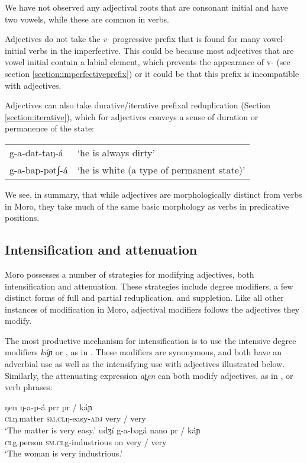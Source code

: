 We have not observed any adjectival roots that are consonant initial and have two vowels, while these are common in verbs. 

Adjectives do not take the \textit{v-} progressive prefix that is found for many vowel-initial verbs in the imperfective. This could be because most adjectives that are vowel initial contain a labial element, which prevents the appearance of v- (see section \ref{section:imperfectiveprefix}) or it could be that this prefix is incompatible with adjectives.

Adjectives can also take durative/iterative prefixal reduplication (Section \ref{section:iterative}), which for adjectives conveys a sense of duration or permanence of the state:

\ea 
\begin{tabular}[t]{ll}
g-a-dat-taŋ-á & ‘he is always dirty’\\
g-a-bap-pətʃ-á & ‘he is white (a type of permanent state)’\\
\end{tabular} \z

We see, in summary, that while adjectives are morphologically distinct from verbs in Moro, they take much of the same basic morphology as verbs in predicative positions.

\subsection{Intensification and attenuation}

Moro possesses a number of strategies for modifying adjectives, both intensification and attenuation. These strategies include degree modifiers, a few distinct forms of full and partial reduplication, and suppletion. Like all other instances of modification in Moro, adjectival modifiers follows the adjectives they modify.

The most productive mechanism for intensification is to use the intensive degree modifiers \textit{káɲ} or , as in \Next. These modifiers are synonymous, and both have an adverbial use as well as the intensifying use with adjectives illustrated below. Similarly, the attenuating expression \textit{at̪en} can both modify adjectives, as in \NNext, or verb phrases:


\ea
	\ea \gll ŋen ŋ-a-p-á prr		pr / káɲ\\
			\textsc{cl}ŋ.matter	\textsc{sm}.\textsc{cl}ŋ-easy-\textsc{adj}	very / very\\
		\glt ‘The matter is very easy.’
	\ex	\gll udʒí 		g-a-bəgá nano	 	pr / káɲ	\\
			\textsc{cl}g.person	\textsc{sm}.\textsc{cl}g-industrious on 	very / very\\
		\glt ‘The woman is very industrious.'
\z \z 
	
